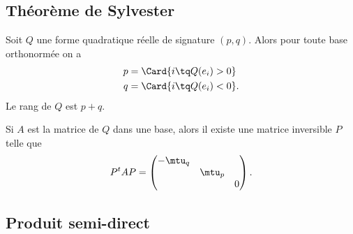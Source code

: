 \subsection{Théorème de Sylvester}


\begin{theorem}[de Sylvester]   \label{ThoQFVsBCk}
    Soit $Q$ une forme quadratique réelle de signature \( (p,q)\). Alors pour toute base orthonormée on a
    \begin{subequations}
        \begin{align}
            p&=\Card\{ i\tq Q(e_i)>0 \}\\
            q&=\Card\{ i\tq Q(e_i)<0 \}.
        \end{align}
    \end{subequations}
    Le rang de \( Q\) est \( p+q\).

    Si \( A\) est la matrice de \( Q\) dans une base, alors il existe une matrice inversible \( P\) telle que
    \begin{equation}
        P^tAP=\begin{pmatrix}
            -\mtu_q    &       &       \\
                &   \mtu_p    &       \\
                &       &   0
        \end{pmatrix}.
    \end{equation}
\end{theorem}

\subsection{Produit semi-direct}

